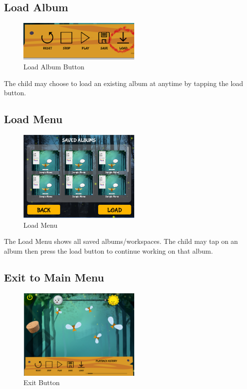 \subsection{Load Album}

\begin{figure}[H]
    \centering
    \includegraphics[width=6cm]{figures/load.png}
    \caption{Load Album Button}
    \label{fig:firefly2}
\end{figure}

The child may choose to load an existing album at anytime by tapping the load button.

\subsection{Load Menu}

\begin{figure}[H]
    \centering
    \includegraphics[width=6cm]{figures/LoadMenu.png}
    \caption{Load Menu}
    \label{fig:loadmenu}
\end{figure}

The Load Menu shows all saved albums/workspaces. The child may tap on an album then press the load button to continue working on that album.

\subsection{Exit to Main Menu}

\begin{figure}[H]
    \centering
    \includegraphics[width=6cm]{figures/exitmenu.png}
    \caption{Exit Button}
    \label{fig:exitbutton}
\end{figure}

